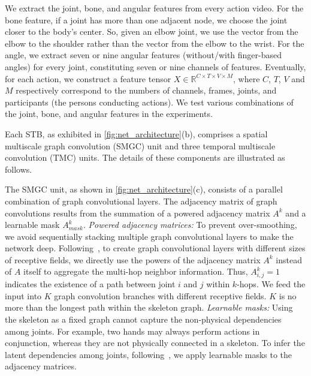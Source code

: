 \documentclass[journal,comsoc]{IEEEtran}
\begin{document}
We extract the joint, bone, and angular features from every action video. For the bone feature, if a joint has more than one adjacent node, we choose the joint closer to the body's center. So, given an elbow joint, we use the vector from the elbow to the shoulder rather than the vector from the elbow to the wrist. For the angle, we extract seven or nine angular features (without/with finger-based angles) for every joint, constituting seven or nine channels of features. Eventually, for each action, we construct a feature tensor $X \in \mathbb{R}^{C \times T \times V \times M}$, where $C$, $T$, $V$ and $M$ respectively correspond to the numbers of channels, frames, joints, and participants (the persons conducting actions). We test various combinations of the joint, bone, and angular features in the experiments. 

Each STB, as exhibited in \autoref{fig:net_architecture}(b), comprises a spatial multiscale graph convolution (SMGC) unit and three temporal multiscale convolution (TMC) units. The details of these components are illustrated as follows. 

The SMGC unit, as shown in \autoref{fig:net_architecture}(c), consists of a parallel combination of graph convolutional layers. The adjacency matrix of graph convolutions results from the summation of a powered adjacency matrix $A^k$ and a learnable mask $A^k_{mask}$. 
\textit{Powered adjacency matrices:}
To prevent over-smoothing, we avoid sequentially stacking multiple graph convolutional layers to make the network deep. Following~\cite{liu2020disentangling}, to create graph convolutional layers with different sizes of receptive fields, we directly use the powers of the adjacency matrix $A^{k}$ instead of $A$ itself to aggregate the multi-hop neighbor information. Thus, $A^{k}_{i,j} = 1$ indicates the existence of a path between joint $i$ and $j$ within $k$-hops. 
We feed the input into $K$ graph convolution branches with different receptive fields. $K$ is no more than the longest path within the skeleton graph. 
\textit{Learnable masks:} Using the skeleton as a fixed graph cannot capture the non-physical dependencies among joints. For example, two hands may always perform actions in conjunction, whereas they are not physically connected in a skeleton.
To infer the latent dependencies among joints, following~\cite{shi2019two}, we apply learnable masks to the adjacency matrices.
\end{document}
